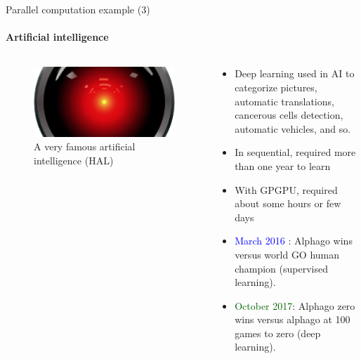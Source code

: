 \documentclass[compress,10pt,aspectratio=169]{beamer}
\begin{document}
\begin{frame}[fragile]{Parallel computation example (3)}
    \framesubtitle{Artificial intelligence}
    \small
    \begin{columns}
        \begin{column}{.5\textwidth}
            \begin{figure}[h]
                \includegraphics[width=\linewidth]{../Images/HAL.png}
                \caption{A very famous artificial intelligence (HAL)}
            \end{figure}        
        \end{column}
        \begin{column}{.5\textwidth}
            \begin{itemize}
                \item Deep learning used in AI to categorize pictures, automatic translations, cancerous cells detection, automatic vehicles, and so.
                \item In sequential, required more than one year to learn
                \item With GPGPU, required about some hours or few days
                \item \textcolor{blue}{March 2016} : Alphago wins versus world GO human champion (supervised learning).
                \item \textcolor{DarkGreen}{October 2017}: Alphago zero wins versus alphago at 100 games to zero (deep learning).
            \end{itemize}            
        \end{column}
    \end{columns}
\end{frame}
\end{document}
